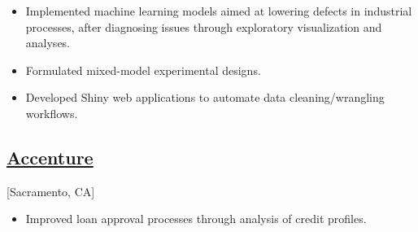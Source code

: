 \documentclass{wm_cv}
\begin{document}
\begin{itemize}
  \item Implemented machine learning models aimed at lowering defects in industrial processes, after diagnosing issues through exploratory visualization and analyses.
  \item Formulated mixed-model experimental designs.
  \item Developed Shiny web applications to automate data cleaning/wrangling workflows.
\end{itemize} 

\subsection{\href{https://en.wikipedia.org/wiki/Accenture}{Accenture}}[Sacramento, CA]
\begin{positions}
\end{positions}

\begin{itemize}
  \item Improved loan approval processes through analysis of credit profiles. 
\end{itemize}






\end{document}
